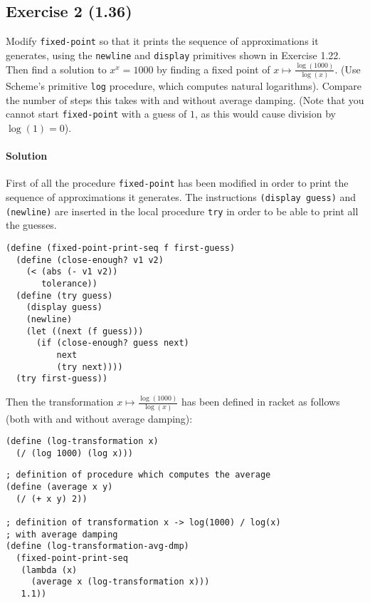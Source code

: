 \subsection*{Exercise 2 (1.36)}
Modify \texttt{fixed-point} so that it prints the sequence of approximations it generates, using the \texttt{newline} and 
\texttt{display} primitives shown in Exercise 1.22. Then find a solution to $ x^{x} = 1000 $ by finding a fixed point of
$ x \mapsto \frac{\log(1000)}{\log(x)} $.
(Use Scheme's primitive \texttt{log} procedure, which computes natural logarithms).
Compare the number of steps this takes with and without average damping.
(Note that you cannot start \texttt{fixed-point} with a guess of $ 1 $, as this would cause division by $ \log(1) = 0 $).

\paragraph{Solution} 
First of all the procedure \texttt{fixed-point} has been modified in order to print the sequence of approximations it generates.
The instructions \texttt{(display guess)} and \texttt{(newline)} are inserted in the local procedure \texttt{try} in order to be
able to print all the guesses.
\begin{lstlisting}[caption={Procedure \texttt{fixed-point} which prints the sequence of approximations it generates},captionpos=b]
(define (fixed-point-print-seq f first-guess)
  (define (close-enough? v1 v2)
    (< (abs (- v1 v2))
       tolerance))
  (define (try guess)
    (display guess)
    (newline)
    (let ((next (f guess)))
      (if (close-enough? guess next)
          next
          (try next))))
  (try first-guess))
\end{lstlisting}
Then the transformation $ x \mapsto \frac{\log(1000)}{\log(x)} $ has been defined in racket as follows 
(both with and without average damping):
\begin{lstlisting}[caption={Transformation without average-damping},captionpos=b]
(define (log-transformation x)
  (/ (log 1000) (log x)))
\end{lstlisting}
\begin{lstlisting}[caption={Transformation with average damping},captionpos=b]
; definition of procedure which computes the average
(define (average x y) 
  (/ (+ x y) 2))

; definition of transformation x -> log(1000) / log(x) 
; with average damping
(define (log-transformation-avg-dmp)
  (fixed-point-print-seq
   (lambda (x)
     (average x (log-transformation x)))
   1.1))
\end{lstlisting}
